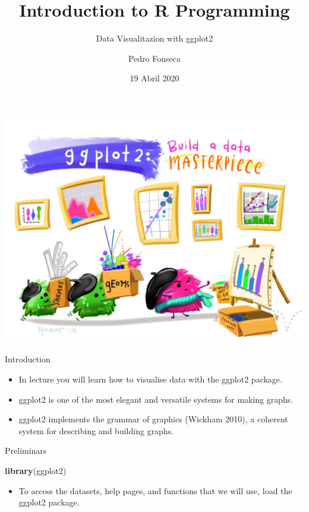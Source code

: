 \documentclass[ignorenonframetext,]{beamer}
\title{Introduction to R Programming}
\subtitle{Data Visualitazion with ggplot2}
\author{Pedro Fonseca}
\date{19 Abril 2020}
\newenvironment{Shaded}{\begin{snugshade}}{\end{snugshade}}
\newcommand{\KeywordTok}[1]{\textcolor[rgb]{0.13,0.29,0.53}{\textbf{#1}}}
\newcommand{\NormalTok}[1]{#1}
\providecommand{\tightlist}{%
  \setlength{\itemsep}{0pt}\setlength{\parskip}{0pt}}
\begin{document}
\frame{\titlepage}

\begin{frame}

\includegraphics{pic.png}

\end{frame}

\begin{frame}{Introduction}
\protect\hypertarget{introduction}{}

\begin{itemize}
\item
  In lecture you will learn how to visualise data with the ggplot2
  package.
\item
  ggplot2 is one of the most elegant and versatile systems for making
  graphs.
\item
  ggplot2 implements the grammar of graphics (Wickham 2010), a coherent
  system for describing and building graphs.
\end{itemize}

\end{frame}

\begin{frame}[fragile]{Preliminars}
\protect\hypertarget{preliminars}{}

\begin{Shaded}
\begin{Highlighting}[]
\KeywordTok{library}\NormalTok{(ggplot2)}
\end{Highlighting}
\end{Shaded}

\begin{itemize}
\tightlist
\item
  To access the datasets, help pages, and functions that we will use,
  load the ggplot2 package.
\end{itemize}

\end{frame}
\end{document}

